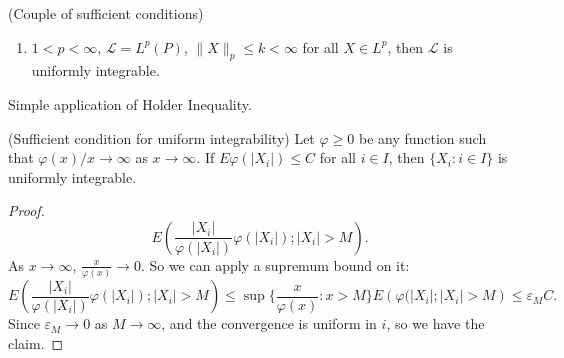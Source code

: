 \begin{proposition}(Couple of sufficient conditions)
	\begin{enumerate}
		\item $1 < p < \infty $, $\mathcal{L} = L^p(P)$, $\|X\|_p \le  k < \infty $ for all $X \in L^p$, then $\mathcal{L}$ is uniformly integrable.
	\end{enumerate}
\end{proposition}
Simple application of Holder Inequality.

\begin{proposition}
	(Sufficient condition for uniform integrability)
	Let $\varphi\ge 0$ be any function such that $\varphi(x) / x \to \infty $ as $x \to  \infty $. If $E \varphi(|X_i|) \le C$ for all $i \in I$, then $\{X_i:  i \in I\} $ is uniformly integrable.
\end{proposition}
\begin{proof}
	\[
		E\left( \frac{|X_i|}{\varphi(|X_i|)} \varphi(|X_i|) ; |X_i| > M \right) 
	.\] 
	As $x \to  \infty $, $\frac{x}{\varphi(x)} \to 0$. So we can apply a supremum bound on it:
	\[
		E\left( \frac{|X_i|}{\varphi(|X_i|)} \varphi(|X_i|) ; |X_i| > M \right) 
		\le \sup \{\frac{x}{\varphi(x)}: x > M\} E\left( \varphi(|X_i| ; |X_i| > M \right)  
		\le \varepsilon_M C
	.\] 
	Since $\varepsilon_M \to  0$ as $M \to \infty $, and the convergence is uniform in $i$, so we have the claim.
\end{proof}



